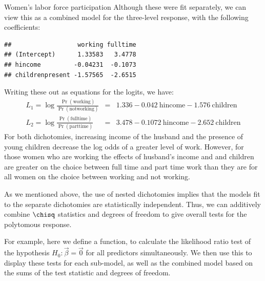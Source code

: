 \documentclass[11pt]{book}
\renewenvironment{knitrout}{\small\renewcommand{\baselinestretch}{.85}}{} %
\begin{document}
\begin{Example}[wlfpart1]{Women's labor force participation}
Although these were fit separately, we can view this as a
combined model for the three-level response, with the following coefficients:  
\begin{knitrout}
\color{fgcolor}\begin{kframe}
\begin{alltt}
\hlstd{(}\hlstd{=} \hlstd{=}
\end{alltt}
\begin{verbatim}
##                  working fulltime
## (Intercept)      1.33583   3.4778
## hincome         -0.04231  -0.1073
## childrenpresent -1.57565  -2.6515
\end{verbatim}
\end{kframe}
\end{knitrout}
Writing these out as equations for the logits, we have:
\begin{eqnarray}
 L_1 = \log \frac{\Pr (\mathrm{working})}{\Pr (\mathrm{not working})} &=&
    1.336 - 0.042 \: \mathrm{hincome} - 1.576 \: \mathrm{children} \label{eq:wlf-logits} \\
 L_2 = \log \frac{\Pr (\mathrm{fulltime})}{\Pr (\mathrm{parttime})} &=&
    3.478 - 0.1072 \: \mathrm{hincome} - 2.652 \: \mathrm{children} 
\end{eqnarray}
For both dichotomies, increasing income of the husband and the 
presence of young children decrease the log odds of a greater
level of work.  However, for those women who are working
the effects of husband's income and 
and children are greater on the choice between full time
and part time work than they are for all women
on the choice between working and not working.

As we mentioned above, the use of nested dichotomies implies that
the models fit to the separate dichotomies are statistically
independent.  Thus, we can additively combine $\chisq$ statistics
and degrees of freedom to give overall tests for the polytomous
response.  

For example, here we define a function,
 to calculate the likelihood ratio
test of the hypothesis $H_0 : \vec{\beta}=\vec{0}$ for all predictors
simultaneously.
We then use this
to display these tests for each sub-model, as well as the
combined model based on the sums of the test statistic
and degrees of freedom.


\end{Example}
\end{document}
